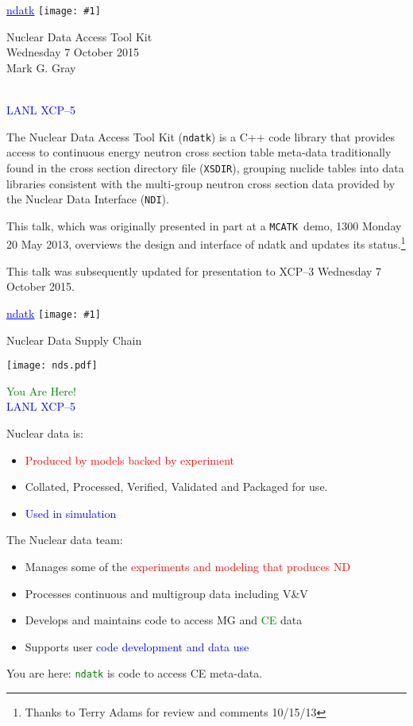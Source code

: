 \documentclass[clock]{slides}
\newenvironment{xslide}[1][logo.jpg]{\begin{slide} \tiny
\textcolor{blue}{\underline{ndatk}} \hfill
\texttt{[image: \#1]}
\normalsize}{\vfill\tiny
\textcolor{blue}{\hrulefill \\LANL XCP--5}
\end{slide}}
\newcommand{\ndatk}{\texttt{ndatk}}
\newcommand{\MCATK}{\texttt{MCATK}}
\newcommand{\NDI}{\texttt{NDI}}
\begin{document}
\begin{xslide}

\begin{center}\Large
Nuclear Data Access Tool Kit\\
Wednesday 7 October 2015\\
\vspace{2in}
Mark G. Gray\\ 
\end{center}

\end{xslide}

\begin{note}\small
The Nuclear Data Access Tool Kit (\ndatk) is a C++ code library that
provides access to continuous energy neutron cross section table
meta-data traditionally found in the cross section directory file
(\texttt{XSDIR}), grouping nuclide tables into data libraries
consistent with the multi-group neutron cross section data provided by
the Nuclear Data Interface (\NDI).

This talk, which was originally presented in part at a \MCATK\ demo,
1300 Monday 20 May 2013, overviews the design and interface of ndatk
and updates its status.\footnote{Thanks to Terry Adams for review and
  comments 10/15/13}

This talk was subsequently updated for presentation to XCP--3
Wednesday 7 October 2015.
\end{note}

\begin{xslide}
\begin{center}\Large
Nuclear Data Supply Chain
\end{center}

\begin{center}
\texttt{[image: nds.pdf]}
\end{center}
\textcolor{green}{You Are Here!}
\end{xslide}

\begin{note}\small
Nuclear data is:
\begin{itemize}
\item \textcolor{red}{Produced by models backed by experiment}
\item Collated, Processed, Verified, Validated and Packaged for use.
\item \textcolor{blue}{Used in simulation}
\end{itemize}

The Nuclear data team:
\begin{itemize}
\item Manages some of the \textcolor{red}{experiments and modeling
  that produces ND}
\item Processes continuous and multigroup data including V\&V
\item Develops and maintains code to access MG and
  \textcolor{green}{CE} data
\item Supports user \textcolor{blue}{code development and data use}
\end{itemize}

You are here: \textcolor{green}{\ndatk} is code to access CE
meta-data.
\end{note}
\end{document}
